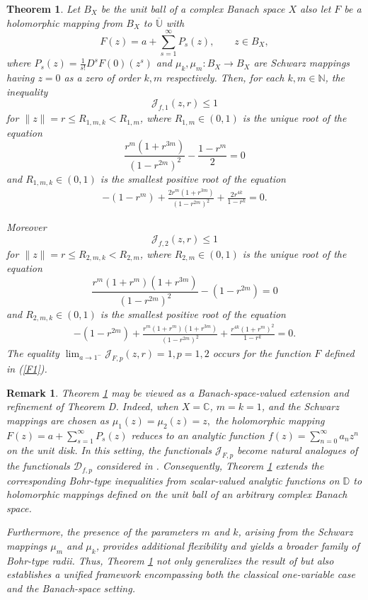 \documentclass[11pt, reqno]{amsart}
\newtheorem*{cor A}{Corollary A}
\newtheorem*{cor B}{Corollary B}
\newtheorem{theo}{Theorem}[section]
\newtheorem{rem}{Remark}[section]
\newcommand{\ol}{\overline}
\newcommand{\bea}{\begin{eqnarray}}
\newcommand{\eea}{\end{eqnarray}}
\numberwithin{equation}{section}
\begin{document}
\begin{theo}\label{T1}
Let $B_{X}$ be the unit ball of a complex Banach space $X$ also let $F$ be a holomorphic mapping from $B_{X}$ to $\ol{\mathbb{U}}$ with
\[
F(z)=a+\sum_{s=1}^{\infty}P_{s}(z), \qquad z\in B_{X},
\]
where $P_{s}(z)=\frac{1}{s!}D^{s}F(0)(z^{s})$ and   $\mu_k,\mu_m:B_{X}\to B_{X}$ are  Schwarz mappings having $z=0$ as a zero of order $k,m$ respectively. Then,  for each $k,m\in\mathbb{N}$, the inequality
\[\mathcal{J}_{f,1}(z,r)\leq 1\]
for $\|z\|=r\leq R_{1,m,k}<R_{1,m}$, where $R_{1,m}\in(0,1)$ is the unique root of the equation 
\[\frac{r^m(1+r^{3m})}{(1-r^{2m})^2}-\frac{1-r^m}{2}=0\]
and $R_{1,m,k}\in(0,1)$ is the smallest positive root of the equation
\bea\label{rr1}
-(1-r^m)+\frac{2r^m(1+r^{3m})}{(1-r^{2m})^2}+\frac{2r^{4k}}{1-r^k}=0.
\eea

Moreover 
 \[\mathcal{J}_{f,2}(z,r)\leq 1\]
 for $\|z\|=r\leq R_{2,m,k}<R_{2,m}$, where $R_{2,m}\in(0,1)$ is the unique root of the equation 
 \[\frac{r^m(1+r^m)(1+r^{3m})}{(1-r^{2m})^2}-(1-r^{2m})=0\]
and $R_{2,m,k}\in(0,1)$ is the smallest positive root of the equation
\bea\label{rr2}-(1-r^{2m})+\frac{r^m(1+r^m)(1+r^{3m})}{(1-r^{2m})^2}+\frac{r^{4k}(1+r^m)^2}{1-r^k}=0.\eea
The equality $\lim_{a\to 1^-} \mathcal{J}_{F,p}(z,r)=1, p=1,2$ occurs for the function  $F$ defined in (\ref{F1}).
\end{theo}
\begin{rem}
Theorem \ref{T1} may be viewed as a Banach-space-valued extension and refinement of Theorem D\cite[Theorem 2.2]{AR2025}. Indeed, when $X=\mathbb{C}$, $m=k=1$, and the Schwarz mappings are chosen as $\mu_1(z)=\mu_2(z)=z,$ the holomorphic mapping $F(z)=a+\sum_{s=1}^{\infty}P_s(z)$ reduces to an analytic function $f(z)=\sum_{n=0}^{\infty}a_n z^n$ on the unit disk. In this setting, the functionals $\mathcal{J}_{F,p}$ become natural analogues of the functionals $\mathcal{D}_{f,p}$ considered in \cite{AR2025}. Consequently, Theorem \ref{T1} extends the corresponding Bohr-type inequalities from scalar-valued analytic functions on $\mathbb{D}$ to holomorphic mappings defined on the unit ball of an arbitrary complex Banach space.\par

Furthermore, the presence of the parameters $m$ and $k$, arising from the Schwarz mappings $\mu_m$ and $\mu_k$, provides additional flexibility and yields a broader family of Bohr-type radii. Thus, Theorem \ref{T1} not only generalizes the result of \cite{AR2025} but also establishes a unified framework encompassing both the classical one-variable case and the Banach-space setting.
\end{rem}
\end{document}
